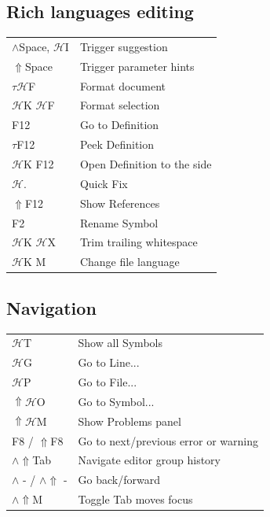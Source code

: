 \documentclass[UTF8]{article}
\begin{document}
\subsection*{Rich languages editing}
\begin{tabular}{ll}
$\wedge$Space, $\mathscr{H}$I & Trigger suggestion \\
$\Uparrow$Space & Trigger parameter hints \\
$\tau\mathscr{H}$F & Format document \\
$\mathscr{H}$K $\mathscr{H}$F & Format selection \\
F12 & Go to Definition \\
$\tau$F12 & Peek Definition \\
$\mathscr{H}$K F12 & Open Definition to the side \\
$\mathscr{H}$. & Quick Fix \\
$\Uparrow$F12 & Show References \\
F2 & Rename Symbol \\
$\mathscr{H}$K $\mathscr{H}$X & Trim trailing whitespace \\
$\mathscr{H}$K M & Change file language \\
\end{tabular}

\subsection*{Navigation}
\begin{tabular}{ll}
$\mathscr{H}$T & Show all Symbols \\
$\mathscr{H}$G & Go to Line... \\
$\mathscr{H}$P & Go to File... \\
$\Uparrow\mathscr{H}$O & Go to Symbol... \\
$\Uparrow\mathscr{H}$M & Show Problems panel \\
F8 / $\Uparrow$F8 & Go to next/previous error or warning \\
$\wedge\Uparrow$Tab & Navigate editor group history \\
$\wedge$ - / $\wedge\Uparrow$ - & Go back/forward \\
$\wedge\Uparrow$M & Toggle Tab moves focus \\
\end{tabular}
\end{document}
